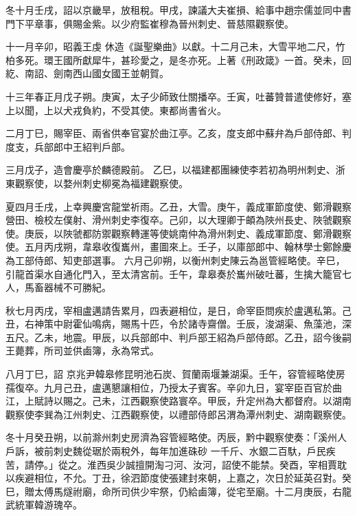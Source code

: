 \begin{pinyinscope}
 冬十月壬戌，詔以京畿旱，放租稅。甲戌，諫議大夫崔損、給事中趙宗儒並同中書門下平章事，俱賜金紫。以少府監崔穆為晉州刺史、晉慈隰觀察使。



 十一月辛卯，昭義王虔
 休造《誕聖樂曲》以獻。十二月己未，大雪平地二尺，竹柏多死。環王國所獻犀牛，甚珍愛之，是冬亦死。上著《刑政箴》一首。癸未，回紇、南詔、劍南西山國女國王並朝賀。



 十三年春正月戊子朔。庚寅，太子少師致仕關播卒。壬寅，吐蕃贊普遣使修好，塞上以聞，上以犬戎負約，不受其使。東都尚書省火。



 二月丁巳，賜宰臣、兩省供奉官宴於曲江亭。乙亥，度支郎中蘇弁為戶部侍郎、判度支，兵部郎中王紹判戶部。



 三月戊子，造會慶亭於麟德殿前。
 乙巳，以福建都團練使李若初為明州刺史、浙東觀察使，以婺州刺史柳冕為福建觀察使。



 夏四月壬戌，上幸興慶宮龍堂祈雨。乙丑，大雪。庚午，義成軍節度使、鄭滑觀察營田、檢校左僕射、滑州刺史李復卒。己卯，以大理卿于頔為陜州長史、陜虢觀察使。庚辰，以陜虢都防禦觀察轉運等使姚南仲為滑州刺史、義成軍節度、鄭滑觀察使。五月丙戌朔，韋皋收復巂州，畫圖來上。壬子，以庫部郎中、翰林學士鄭餘慶為工部侍郎、知吏部選事。
 六月己卯朔，以衡州刺史陳云為邕管經略使。辛巳，引龍首渠水自通化門入，至太清宮前。壬午，韋皋奏於巂州破吐蕃，生擒大籠官七人，馬畜器械不可勝紀。



 秋七月丙戌，宰相盧邁請告累月，四表避相位，是日，命宰臣問疾於盧邁私第。己丑，右神策中尉霍仙鳴病，賜馬十匹，令於諸寺齋僧。壬辰，浚湖渠、魚藻池，深五尺。乙未，地震。甲辰，以兵部郎中、判戶部王紹為戶部侍郎。乙丑，詔今後嗣王薨葬，所司並供鹵簿，永為常式。



 八月丁巳，詔
 京兆尹韓皋修昆明池石炭、賀蘭兩堰兼湖渠。壬午，容管經略使房孺復卒。九月己丑，盧邁懇讓相位，乃授太子賓客。辛卯九日，宴宰臣百官於曲江，上賦詩以賜之。己未，江西觀察使路寰卒。甲辰，升定州為大都督府。以湖南觀察使李巽為江州刺史、江西觀察使，以禮部侍郎呂渭為潭州刺史、湖南觀察使。



 冬十月癸丑朔，以前滁州刺史房濟為容管經略使。丙辰，黔中觀察使奏：「溪州人戶訴，被前刺史魏從琚於兩稅外，每年加進硃砂
 一千斤、水銀二百馱，戶民疾苦，請停。」從之。淮西吳少誠擅開淘刁河、汝河，詔使不能禁。癸酉，宰相賈耽以疾避相位，不允。丁丑，徐泗節度使張建封來朝，上嘉之，次日於延英召對。癸巳，贈太傅馬燧祔廟，命所司供少牢祭，仍給鹵簿，從宅至廟。十二月庚辰，右龍武統軍韓游瑰卒。




\end{pinyinscope}
